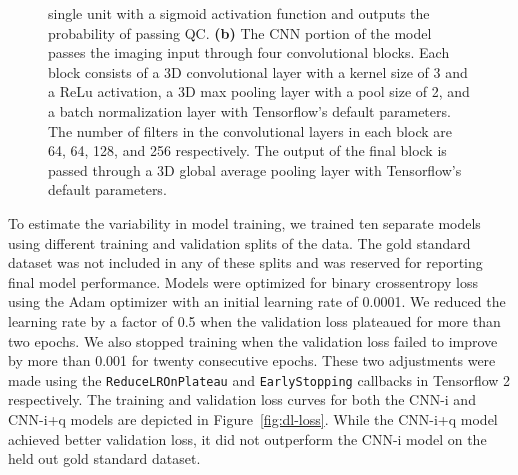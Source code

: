 \documentclass[fleqn,10pt,inline]{wlscirep}
\begin{document}
\begin{figure}[tbp]
{        single unit with a sigmoid activation function and outputs the
        probability of passing QC.
        \textbf{(b)} The CNN portion of the model passes the imaging input
        through four convolutional blocks. Each block consists of a 3D
        convolutional layer with a kernel size of 3 and a ReLu activation, a 3D
        max pooling layer with a pool size of 2, and a batch normalization layer
        with Tensorflow's default parameters. The number of filters in the
        convolutional layers in each block are 64, 64, 128, and 256 respectively.
        The output of the final block is passed through a 3D global average
        pooling layer with Tensorflow's default parameters.
    }
    \label{fig:dl-architecture}
\end{figure}

To estimate the variability in model training, we trained ten separate models using
different training and validation splits of the data. The gold standard dataset
was not included in any of these splits and was reserved for reporting final
model performance. Models were optimized for binary crossentropy loss using the
Adam optimizer \cite{kingma2017adam} with an initial learning rate of 0.0001. We
reduced the learning rate by a factor of 0.5 when the validation loss plateaued
for more than two epochs. We also stopped training when the validation loss
failed to improve by more than 0.001 for twenty consecutive epochs. These two
adjustments were made using the \texttt{ReduceLROnPlateau} and
\texttt{EarlyStopping} callbacks in Tensorflow 2 \cite{tensorflow} respectively.
The training and validation loss curves for both the CNN-i and CNN-i+q models
are depicted in Figure~\ref{fig:dl-loss}. While the CNN-i+q model achieved
better validation loss, it did not outperform the CNN-i model on the held out
gold standard dataset.
\end{document}
